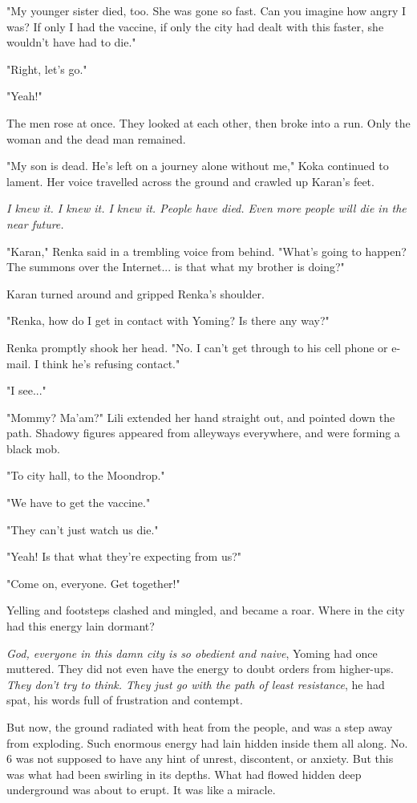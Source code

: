 "My younger sister died, too. She was gone so fast. Can you imagine how
angry I was? If only I had the vaccine, if only the city had dealt with
this faster, she wouldn't have had to die."

"Right, let's go."

"Yeah!"

The men rose at once. They looked at each other, then broke into a run.
Only the woman and the dead man remained.

"My son is dead. He's left on a journey alone without me," Koka
continued to lament. Her voice travelled across the ground and crawled
up Karan's feet.

\emph{I knew it. I knew it. I knew it. People have died. Even more people will
die in the near future.}

"Karan," Renka said in a trembling voice from behind. "What's going to
happen? The summons over the Internet... is that what my brother is
doing?"

Karan turned around and gripped Renka's shoulder.

"Renka, how do I get in contact with Yoming? Is there any way?"

Renka promptly shook her head. "No. I can't get through to his cell
phone or e-mail. I think he's refusing contact."

"I see..."

"Mommy? Ma'am?" Lili extended her hand straight out, and pointed down
the path. Shadowy figures appeared from alleyways everywhere, and were
forming a black mob.

"To city hall, to the Moondrop."

"We have to get the vaccine."

"They can't just watch us die."

"Yeah! Is that what they're expecting from us?"

"Come on, everyone. Get together!"

Yelling and footsteps clashed and mingled, and became a roar. Where in
the city had this energy lain dormant?

\emph{God, everyone in this damn city is so obedient and naive}, Yoming had
once muttered. They did not even have the energy to doubt orders from
higher-ups. \emph{They don't try to think. They just go with the path of least
resistance}, he had spat, his words full of frustration and contempt.

But now, the ground radiated with heat from the people, and was a step
away from exploding. Such enormous energy had lain hidden inside them
all along. No. 6 was not supposed to have any hint of unrest,
discontent, or anxiety. But this was what had been swirling in its
depths. What had flowed hidden deep underground was about to erupt. It
was like a miracle.

